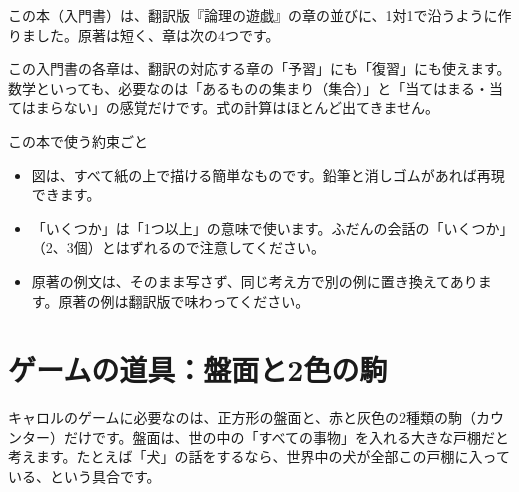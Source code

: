 \documentclass[a4paper,11pt,openany]{ltjsbook}
\begin{document}
この本（入門書）は、翻訳版『論理の遊戯』の章の並びに、1対1で沿うように作りました。原著は短く、章は次の4つです。

\begin{center}
\end{center}

この入門書の各章は、翻訳の対応する章の「予習」にも「復習」にも使えます。数学といっても、必要なのは「あるものの集まり（集合）」と「当てはまる・当てはまらない」の感覚だけです。式の計算はほとんど出てきません。

\begin{pointbox}{この本で使う約束ごと}
\begin{itemize}[leftmargin=1.5em]
\item 図は、すべて紙の上で描ける簡単なものです。鉛筆と消しゴムがあれば再現できます。
\item 「いくつか」は「1つ以上」の意味で使います。ふだんの会話の「いくつか」（2、3個）とはずれるので注意してください。
\item 原著の例文は、そのまま写さず、同じ考え方で別の例に置き換えてあります。原著の例は翻訳版で味わってください。
\end{itemize}
\end{pointbox}

\section*{ゲームの道具：盤面と2色の駒}

キャロルのゲームに必要なのは、正方形の盤面と、赤と灰色の2種類の駒（カウンター）だけです。盤面は、世の中の「すべての事物」を入れる大きな戸棚だと考えます。たとえば「犬」の話をするなら、世界中の犬が全部この戸棚に入っている、という具合です。
\end{document}
